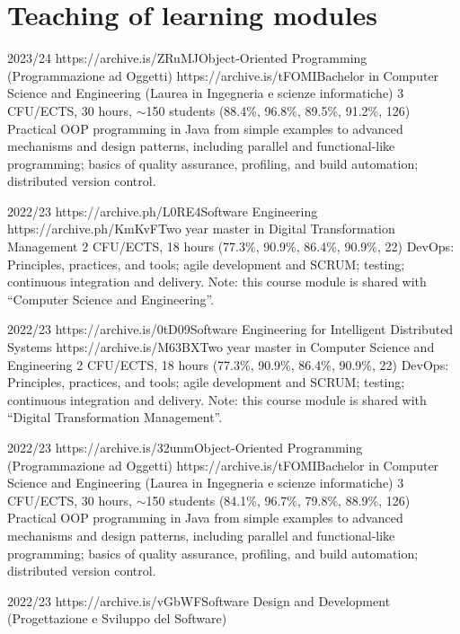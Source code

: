 \section{Teaching of learning modules}
\vspace{-1.9em}
\newcommand{\oopjava}{Practical OOP programming in Java from simple examples to advanced mechanisms and design patterns, including parallel and functional-like programming; basics of quality assurance, profiling, and build automation; distributed version control.}
\newcommand{\sedtmeit}{DevOps: Principles, practices, and tools; agile development and SCRUM; testing; continuous integration and delivery.}
\begin{outerlist}
    \item[2023/24]
        \unibocourse
        {https://archive.is/ZRuMJ}{Object-Oriented Programming (Programmazione ad Oggetti)}
        {https://archive.is/tFOMI}{Bachelor in Computer Science and Engineering (Laurea in Ingegneria e scienze informatiche)}
        {3 CFU/ECTS, 30 hours, $\sim$150 students}
        {(88.4\%, 96.8\%, 89.5\%, 91.2\%, 126)}
        {\oopjava}
    \item[2022/23]
        \unibocourse %
        {https://archive.ph/L0RE4}{Software Engineering}
        {https://archive.ph/KmKvF}{Two year master in Digital Transformation Management}
        {2 CFU/ECTS, 18 hours}
        {(77.3\%, 90.9\%, 86.4\%, 90.9\%, 22)}
        {
            \sedtmeit{}
            Note: this course module is shared with ``Computer Science and Engineering''.
        }
    \item[2022/23]
        \unibocourse %
        {https://archive.is/0tD09}{Software Engineering for Intelligent Distributed Systems}
        {https://archive.is/M63BX}{Two year master in Computer Science and Engineering}
        {2 CFU/ECTS, 18 hours}
        {(77.3\%, 90.9\%, 86.4\%, 90.9\%, 22)}
        {
            \sedtmeit{}
            Note: this course module is shared with ``Digital Transformation Management''.
        }
    \item[2022/23]
        \unibocourse
        {https://archive.is/32unm}{Object-Oriented Programming (Programmazione ad Oggetti)}
        {https://archive.is/tFOMI}{Bachelor in Computer Science and Engineering (Laurea in Ingegneria e scienze informatiche)}
        {3 CFU/ECTS, 30 hours, $\sim$150 students}
        {(84.1\%, 96.7\%, 79.8\%, 88.9\%, 126)}
        {\oopjava}
    \item[2022/23]
        \unibocourse
        {https://archive.is/vGbWF}{Software Design and Development (Progettazione e Sviluppo del Software)}

\end{outerlist}
